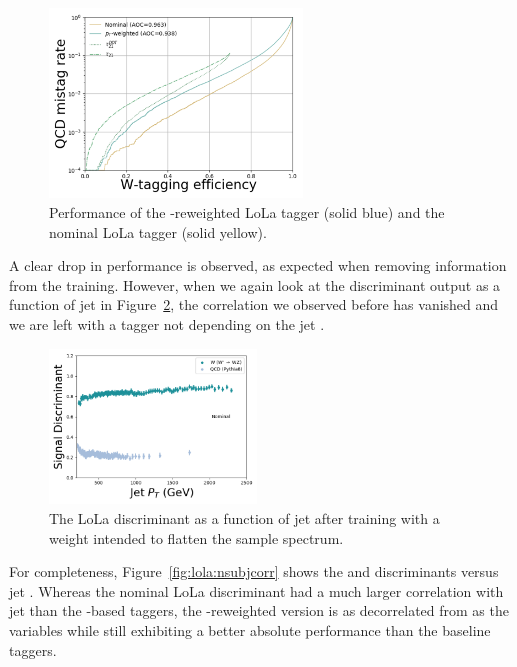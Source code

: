 \begin{figure}[h!]
\centering
\includegraphics[width=0.6\textwidth]{figures/vtagging/AN-18-099/training/lolaptrew.png}
\caption{Performance of the \PT-reweighted LoLa tagger (solid blue) and the nominal LoLa tagger (solid yellow).}
\label{fig:lola:rocptweighted}
\end{figure}
A clear drop in performance is observed, as expected when removing information from the training. However, when we again look at the discriminant output as a function of jet \PT in Figure~\ref{fig:lola:ptweightedcorr}, the correlation we observed before has vanished and we are left with a tagger not depending on the jet \PT.
\begin{figure}[h!]
\centering
\includegraphics[width=0.49\textwidth]{figures/vtagging/lola/wLola_v6_Weighted_withM_withPT-profile-jpt.png}
\caption{The LoLa discriminant as a function of jet \PT after training with a weight intended to flatten the sample \PT spectrum.}
\label{fig:lola:ptweightedcorr}
\end{figure}
For completeness, Figure~\ref{fig:lola:nsubjcorr} shows the \nsubj and \ddt discriminants versus jet \PT. Whereas the nominal LoLa discriminant had a much larger correlation with jet \PT than the \nsubj-based taggers, the \PT-reweighted version is as decorrelated from \PT as the \nsubj variables while still exhibiting a better absolute performance than the baseline taggers.

